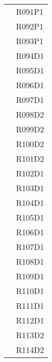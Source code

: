 \documentclass[../analisi-dei-requisiti.tex]{subfiles}
\begin{document}
\begin{longtable}[H]{>{\centering}m{5cm} >{\centering}m{5cm}}
                                & R091P1                               \\
                                & R092P1                               \\
                                & R093P1                               \\
                                & R094D1                               \\
                                & R095D1                               \\
                                & R096D1                               \\
                                & R097D1                               \\
                                & R098D2                               \\
                                & R099D2                               \\
                                & R100D2                               \\
                                & R101D2                               \\
                                & R102D1                               \\
                                & R103D1                               \\
                                & R104D1                               \\
                                & R105D1                               \\
                                & R106D1                               \\
                                & R107D1                               \\
                                & R108D1                               \\
                                & R109D1                               \\
                                & R110D1                               \\
                                & R111D1                               \\
                                & R112D1                               \\
                                & R113D2                               \\
                                & R114D2                               \\
\end{longtable}
\end{document}

